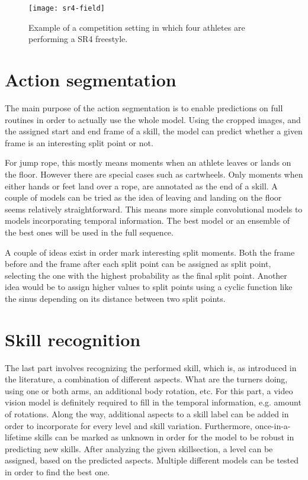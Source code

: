 \begin{figure}
    \centering
    \texttt{[image: sr4-field]}
    \caption[Example jump rope competition setting]{Example of a competition setting in which four athletes are performing a SR4 freestyle.}
    \label{fig:sr4-field}
\end{figure}


\section{Action segmentation}
\label{methodology:action-segmentation}

The main purpose of the action segmentation is to enable predictions on full routines in order to actually use the whole model. Using the cropped images, and the assigned start and end frame of a skill, the model can predict whether a given frame is an interesting split point or not.

For jump rope, this mostly means moments when an athlete leaves or lands on the floor. However there are special cases such as cartwheels. Only moments when either hands or feet land over a rope, are annotated as the end of a skill. A couple of models can be tried as the idea of leaving and landing on the floor seems relatively straightforward. This means more simple convolutional models to models incorporating temporal information.
The best model or an ensemble of the best ones will be used in the full sequence.

A couple of ideas exist in order mark interesting split moments. Both the frame before and the frame after each split point can be assigned as split point, selecting the one with the highest probability as the final split point. Another idea would be to assign higher values to split points using a cyclic function like the sinus depending on its distance between two split points.

\section{Skill recognition}
\label{methodology:skill-recognition}

The last part involves recognizing the performed skill, which is, as introduced in the literature, a combination of different aspects. What are the turners doing, using one or both arms, an additional body rotation, etc.
For this part, a video vision model is definitely required to fill in the temporal information, e.g. amount of rotations.
Along the way, additional aspects to a skill label can be added in order to incorporate for every level and skill variation.
Furthermore, once-in-a-lifetime skills can be marked as unknown in order for the model to be robust in predicting new skills. After analyzing the given skillsection, a level can be assigned, based on the predicted aspects.
Multiple different models can be tested in order to find the best one.


